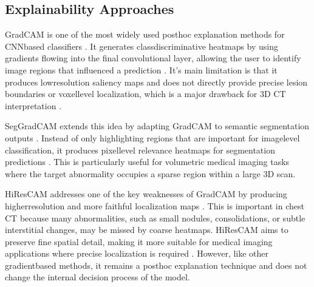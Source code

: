 \subsection{Explainability Approaches}

GradCAM is one of the most widely used posthoc explanation methods for CNNbased classifiers \cite{selvaraju2017gradcam}. 
It generates classdiscriminative heatmaps by using gradients flowing into the final convolutional layer, allowing the user to identify
image regions that influenced a prediction \cite{selvaraju2017gradcam}. 
It's main limitation is that it produces lowresolution saliency maps and does not directly provide precise lesion boundaries or
voxellevel localization, which is a major drawback for 3D CT interpretation \cite{selvaraju2017gradcam,draelos2021usehirescaminsteadgradcam}.

SegGradCAM extends this idea by adapting GradCAM to semantic segmentation outputs \cite{Suara_2024}. 
Instead of only highlighting regions that are important for imagelevel classification, it produces pixellevel relevance heatmaps for
segmentation predictions \cite{Suara_2024}.
This is particularly useful for volumetric medical imaging tasks where the target abnormality occupies a sparse region within a large 3D scan.

HiResCAM addresses one of the key weaknesses of GradCAM by producing higherresolution and more faithful localization maps \cite{draelos2021usehirescaminsteadgradcam}. 
This is important in chest CT because many abnormalities, such as small nodules, consolidations, or subtle interstitial changes,
may be missed by coarse heatmaps. 
HiResCAM aims to preserve fine spatial detail, making it more suitable for medical imaging applications where precise localization is required \cite{draelos2021usehirescaminsteadgradcam}. 
However, like other gradientbased methods, it remains a posthoc explanation technique and does not change the internal decision process of the model.


